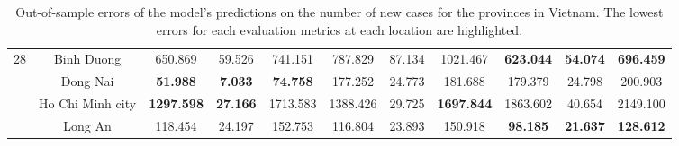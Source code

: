 \begin{landscape}
\begin{table}[!htb]
\begin{tabular}{| c | c | c | c | c | c | c | c | c | c | c |}
        \multirow{4}{*}{28}
            & Binh Duong & 650.869 & 59.526 & 741.151 & 787.829 & 87.134 & 1021.467 & \textbf{623.044} & \textbf{54.074} & \textbf{696.459} \\
            & Dong Nai & \textbf{51.988} & \textbf{7.033} & \textbf{74.758} & 177.252 & 24.773 & 181.688 & 179.379 & 24.798 & 200.903 \\
            & Ho Chi Minh city & \textbf{1297.598} & \textbf{27.166} & 1713.583 & 1388.426 & 29.725 & \textbf{1697.844} & 1863.602 & 40.654 & 2149.100 \\
            & Long An & 118.454 & 24.197 & 152.753 & 116.804 & 23.893 & 150.918 & \textbf{98.185} & \textbf{21.637} & \textbf{128.612} \\ \hline
    \end{tabular}
    \caption{Out-of-sample errors of the model's predictions on the number of new cases for the provinces in Vietnam. The lowest errors for each evaluation metrics at each location are highlighted.}
    \label{tab:errors-vn-provinces-new-cases}
\end{table}
\end{landscape}

